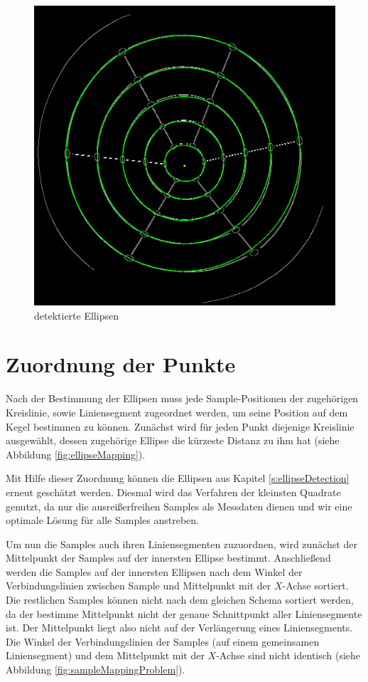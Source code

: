 \begin{figure}[!htb]
	\centering
	\includegraphics[scale=.25]{images/detectedEllipses.png}
	\caption{detektierte Ellipsen}
	\label{fig:detectedEllipses}
\end{figure}

\newpage
\section{Zuordnung der Punkte}
\label{s:pointMapping}
Nach der Bestimmung der Ellipsen muss jede Sample-Positionen der zugehörigen Kreislinie, sowie Liniensegment zugeordnet werden, um seine Position auf dem Kegel bestimmen zu können. 
Zunächst wird für jeden Punkt diejenige Kreislinie ausgewählt, dessen zugehörige Ellipse die kürzeste Distanz zu ihm hat (siehe Abbildung \ref{fig:ellipseMapping}).

Mit Hilfe dieser Zuordnung können die Ellipsen aus Kapitel \ref{s:ellipseDetection} erneut geschätzt werden. Diesmal wird das Verfahren der kleinsten Quadrate genutzt, da nur die ausreißerfreihen Samples als Messdaten dienen und wir eine optimale Lösung für alle Samples anstreben.  

Um nun die Samples auch ihren Liniensegmenten zuzuordnen, wird zunächst der Mittelpunkt der Samples auf der innersten Ellipse bestimmt. Anschließend werden die Samples auf der innersten Ellipsen nach dem Winkel der Verbindungslinien zwischen Sample und Mittelpunkt mit der $X$-Achse sortiert. 
Die restlichen Samples können nicht nach dem gleichen Schema sortiert werden, da der bestimme Mittelpunkt nicht der genaue Schnittpunkt aller Liniensegmente ist. Der Mittelpunkt liegt also nicht auf der Verlängerung eines Liniensegments. Die Winkel der Verbindungslinien der Samples (auf einem gemeinsamen Liniensegment) und dem Mittelpunkt mit der $X$-Achse sind nicht identisch (siehe Abbildung \ref{fig:sampleMappingProblem}).

